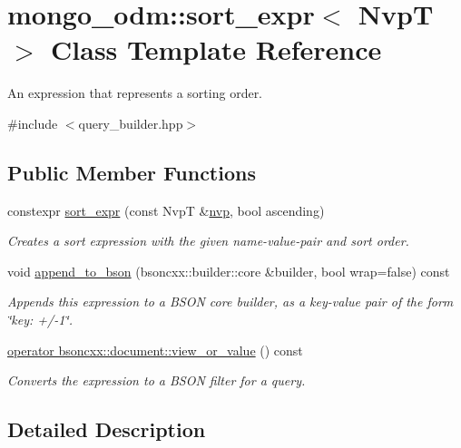 \hypertarget{classmongo__odm_1_1sort__expr}{}\section{mongo\+\_\+odm\+:\+:sort\+\_\+expr$<$ NvpT $>$ Class Template Reference}
\label{classmongo__odm_1_1sort__expr}


An expression that represents a sorting order.  




{\ttfamily \#include $<$query\+\_\+builder.\+hpp$>$}

\subsection*{Public Member Functions}
\begin{DoxyCompactItemize}
\item 
constexpr \hyperlink{classmongo__odm_1_1sort__expr_ac3e032a5c08cb386b68bca201ee3a50d}{sort\+\_\+expr} (const NvpT \&\hyperlink{classmongo__odm_1_1nvp}{nvp}, bool ascending)
\begin{DoxyCompactList}\small\item\em Creates a sort expression with the given name-\/value-\/pair and sort order. \end{DoxyCompactList}\item 
void \hyperlink{classmongo__odm_1_1sort__expr_a304f862be95da026075eb76e007391be}{append\+\_\+to\+\_\+bson} (bsoncxx\+::builder\+::core \&builder, bool wrap=false) const 
\begin{DoxyCompactList}\small\item\em Appends this expression to a B\+S\+ON core builder, as a key-\/value pair of the form \char`\"{}key\+: +/-\/1\char`\"{}. \end{DoxyCompactList}\item 
\hyperlink{classmongo__odm_1_1sort__expr_ad66e7dd012b0be9916b3295646058841}{operator bsoncxx\+::document\+::view\+\_\+or\+\_\+value} () const 
\begin{DoxyCompactList}\small\item\em Converts the expression to a B\+S\+ON filter for a query. \end{DoxyCompactList}\end{DoxyCompactItemize}


\subsection{Detailed Description}
